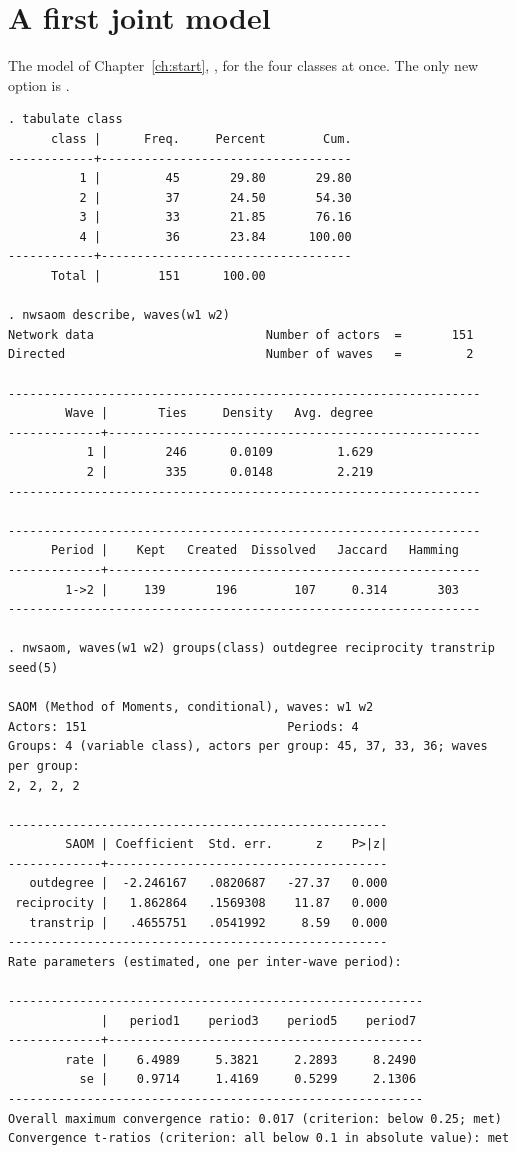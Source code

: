 \section{A first joint model}\label{sec:groups-first}

The model of Chapter~\ref{ch:start}, , for the four classes at once. The only new option is .
\begin{lstlisting}
. tabulate class
      class |      Freq.     Percent        Cum.
------------+-----------------------------------
          1 |         45       29.80       29.80
          2 |         37       24.50       54.30
          3 |         33       21.85       76.16
          4 |         36       23.84      100.00
------------+-----------------------------------
      Total |        151      100.00

. nwsaom describe, waves(w1 w2)
Network data                        Number of actors  =       151
Directed                            Number of waves   =         2

------------------------------------------------------------------
        Wave |       Ties     Density   Avg. degree
-------------+----------------------------------------------------
           1 |        246      0.0109         1.629
           2 |        335      0.0148         2.219
------------------------------------------------------------------

------------------------------------------------------------------
      Period |    Kept   Created  Dissolved   Jaccard   Hamming
-------------+----------------------------------------------------
        1->2 |     139       196        107     0.314       303
------------------------------------------------------------------

. nwsaom, waves(w1 w2) groups(class) outdegree reciprocity transtrip seed(5)

SAOM (Method of Moments, conditional), waves: w1 w2
Actors: 151                            Periods: 4
Groups: 4 (variable class), actors per group: 45, 37, 33, 36; waves per group:
2, 2, 2, 2

-----------------------------------------------------
        SAOM | Coefficient  Std. err.      z    P>|z|
-------------+---------------------------------------
   outdegree |  -2.246167   .0820687   -27.37   0.000
 reciprocity |   1.862864   .1569308    11.87   0.000
   transtrip |   .4655751   .0541992     8.59   0.000
-----------------------------------------------------
Rate parameters (estimated, one per inter-wave period):

----------------------------------------------------------
             |   period1    period3    period5    period7
-------------+--------------------------------------------
        rate |    6.4989     5.3821     2.2893     8.2490
          se |    0.9714     1.4169     0.5299     2.1306
----------------------------------------------------------
Overall maximum convergence ratio: 0.017 (criterion: below 0.25; met)
Convergence t-ratios (criterion: all below 0.1 in absolute value): met
\end{lstlisting}
